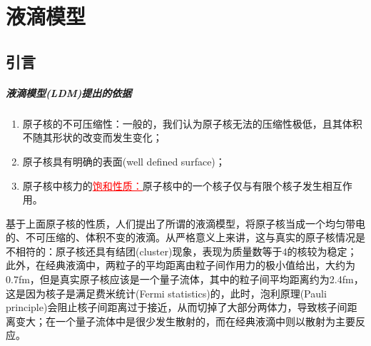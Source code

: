 \chapter{液滴模型}
\section{引言}
\paragraph*{液滴模型(LDM)提出的依据}
\begin{enumerate}
	\item 原子核的不可压缩性：一般的，我们认为原子核无法的压缩性极低，且其体积不随其形状的改变而发生变化；
	\item 原子核具有明确的表面(well defined surface)；
	\item 原子核中核力的\textcolor{red}{\underline{饱和性质：}}原子核中的一个核子仅与有限个核子发生相互作用。
\end{enumerate}

基于上面原子核的性质，人们提出了所谓的液滴模型，将原子核当成一个均匀带电的、不可压缩的、体积不变的液滴。从严格意义上来讲，这与真实的原子核情况是不相符的：原子核还具有结团(cluster)现象，表现为质量数等于4的核较为稳定；此外，在经典液滴中，两粒子的平均距离由粒子间作用力的极小值给出，大约为0.7fm，但是真实原子核应该是一个量子流体，其中的粒子间平均距离约为2.4fm，这是因为核子是满足费米统计(Fermi statistics)的，此时，泡利原理(Pauli principle)会阻止核子间距离过于接近，从而切掉了大部分两体力，导致核子间距离变大；在一个量子流体中是很少发生散射的，而在经典液滴中则以散射为主要反应。

